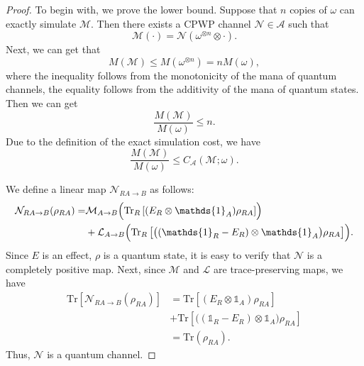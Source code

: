 \documentclass[10pt,a4paper]{amsart}
\begin{document}
\begin{proof}
	To begin with, we prove the lower bound. 
	Suppose that $n$ copies of $\omega$ can exactly simulate $\mathcal{M}$. 
	Then there exists a CPWP channel $\mathcal{N} \in \mathcal{A}$ such that
	\begin{equation}
		\mathcal{M}(\cdot) = \mathcal{N}\left(\omega^{\otimes n}\otimes\cdot\right).
	\end{equation}
	Next, we can get that
	\begin{equation}
			M(\mathcal{M}) \leqslant M (\omega^{\otimes n}) = nM(\omega),
	\end{equation}
	where the inequality follows from the monotonicity of the mana of quantum channels, the equality follows from the additivity of the mana of quantum states.
	Then we can get
	\begin{equation}
		\frac{M(\mathcal{M})}{M(\omega)} \leqslant n.
	\end{equation}
	Due to the definition of the exact simulation cost, we have
	\begin{equation}
		\frac{M(\mathcal{M})}{M(\omega)} \leqslant C_{\mathcal{A}}(\mathcal{M};\omega).
	\end{equation}
	
	We define a linear map $\mathcal{N}_{RA\rightarrow B}$ as follows:
	\begin{equation}\label{definition of N}
		\begin{aligned}
			\mathcal{N}_{RA\rightarrow B}(\rho_{RA}) =& \mathcal{M}_{A\rightarrow B}\Bigl(\mathrm{Tr}_R\left[(E_R\otimes\mathds{1}_A)\rho_{RA}\right]\Bigr) \\ &+ \mathcal{L}_{A\rightarrow B}\Bigl(\mathrm{Tr}_R\left[\bigl((\mathds{1}_R-E_R)\otimes\mathds{1}_A\bigr)\rho_{RA}\right]\Bigr).
		\end{aligned}
	\end{equation}
	Since $E$ is an effect, $\rho$ is a quantum state, it is easy to verify that $\mathcal{N}$ is a completely positive map.
	Next, since $\mathcal{M}$ and $\mathcal{L}$ are trace-preserving maps, we have
	\begin{equation}
		\begin{aligned}
			\mathrm{Tr}\left[\mathcal{N}_{RA\rightarrow B}(\rho_{RA})\right] &= \mathrm{Tr}\left[ (E_R\otimes\mathds{1}_A)\rho_{RA} \right] \\&+ \mathrm{Tr}\left[\bigl((\mathds{1}_R-E_R)\otimes\mathds{1}_A\bigr)\rho_{RA}\right]  \\ &= \mathrm{Tr}(\rho_{RA}).
		\end{aligned}
	\end{equation}
	Thus, $\mathcal{N}$ is a quantum channel.
	

\end{proof}
\end{document}
